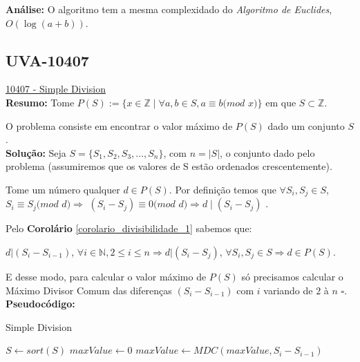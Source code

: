 \textbf{Análise:}
O algoritmo tem a mesma complexidado do \textit{Algoritmo de Euclides}, $O(\log{(a+b)})$. 



\subsection{UVA-10407}
\href{https://uva.onlinejudge.org/index.php?option=onlinejudge&page=show_problem&problem=1348}{10407 - Simple Division} \\

\textbf{Resumo:} 
Tome $P(S) := \{ x \in \mathbb{Z} \mid  \forall a , b \in S , a \equiv b ( mod$ $x)\}$ em que $S \subset \mathbb{Z}$.

O problema consiste em encontrar o valor máximo de $P(S)$ dado um conjunto $S$.
\\

\textbf{Solução:} 
Seja $S = \{S_1, S_2, S_3, ..., S_n\}$, com $n = |S|$, o conjunto dado pelo problema (assumiremos que os valores de S estão ordenados crescentemente).

Tome um número qualquer $d \in P(S)$. Por definição temos que $\forall S_i, S_j \in S$, $S_i \equiv S_j ( mod$ $d) \Rightarrow $ 
$ (S_i-S_j) \equiv 0 ( mod$ $d) \Rightarrow d \mid (S_i-S_j)$ .

Pelo \textbf{Corolário} \autoref{corolario_divisibilidade_1} sabemos que:

$d | (S_i-S_{i-1})$, $ \forall i \in \mathbb{N}, 2 \leq i \leq n \Rightarrow d | (S_i-S_j)$, $ \forall S_i, S_j \in S \Rightarrow d \in P(S)$.

E desse modo, para calcular o valor máximo de $P(S)$ só precisamos calcular o Máximo Divisor Comum das diferenças $(S_i-S_{i-1})$ com $i$ variando de $2$ à $n$ $\square$.
\\

\textbf{Pseudocódigo:}
\begin{algorithm}
\caption{Simple Division}\label{euclid}
\begin{algorithmic}[1]
\State $S \gets sort(S)$  
\State $maxValue \gets 0$
\State $maxValue \gets MDC(maxValue, S_i - S_{i-1})$
\EndFor
\State {}
\EndProcedure
\end{algorithmic}
\end{algorithm}

